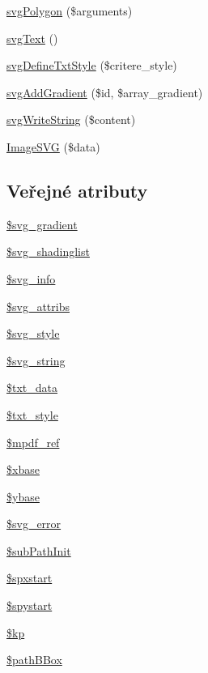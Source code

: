 \begin{DoxyCompactItemize}
\item 
\hyperlink{class_s_v_g_a8aa620a34aa7f03c4be98f58462ed1ba}{svg\-Polygon} (\$arguments)
\item 
\hyperlink{class_s_v_g_a8a02aa9b134167bb207c7899eed128d2}{svg\-Text} ()
\item 
\hyperlink{class_s_v_g_a43f04d1bc674a123f4f262fe49de85df}{svg\-Define\-Txt\-Style} (\$critere\-\_\-style)
\item 
\hyperlink{class_s_v_g_ad3d18ab96a62ae406523cba13be14320}{svg\-Add\-Gradient} (\$id, \$array\-\_\-gradient)
\item 
\hyperlink{class_s_v_g_aba4772ae2118cd81b7f25393ece61434}{svg\-Write\-String} (\$content)
\item 
\hyperlink{class_s_v_g_aa98d46b0c605b645685286a1838c64a8}{Image\-S\-V\-G} (\$data)
\end{DoxyCompactItemize}
\subsection*{Veřejné atributy}
\begin{DoxyCompactItemize}
\item 
\hyperlink{class_s_v_g_a7af1d7443fbab8860431fd8faba87ede}{\$svg\-\_\-gradient}
\item 
\hyperlink{class_s_v_g_a3a87e4c389b95e944d583a943e903260}{\$svg\-\_\-shadinglist}
\item 
\hyperlink{class_s_v_g_acf3e043686c33a3522d3a9977a7f276e}{\$svg\-\_\-info}
\item 
\hyperlink{class_s_v_g_aadddae146f2572ce7596765053e55b59}{\$svg\-\_\-attribs}
\item 
\hyperlink{class_s_v_g_ac77e12c9b6b76da3203c9a493e615312}{\$svg\-\_\-style}
\item 
\hyperlink{class_s_v_g_a8efc8627d939c38e431c20516b058431}{\$svg\-\_\-string}
\item 
\hyperlink{class_s_v_g_a203118bf140223a634aa00b8d55e10e7}{\$txt\-\_\-data}
\item 
\hyperlink{class_s_v_g_a2ae5fc0a696a5f74a720693bccfdf810}{\$txt\-\_\-style}
\item 
\hyperlink{class_s_v_g_ac1da703f34d7051884c1e778806966dc}{\$mpdf\-\_\-ref}
\item 
\hyperlink{class_s_v_g_a0aded876349f4091004a9aa222d0254f}{\$xbase}
\item 
\hyperlink{class_s_v_g_a6ef0f926687479e0ebd731660a89cd28}{\$ybase}
\item 
\hyperlink{class_s_v_g_aa1a28f8b36a24698b86d8b845b9bf34a}{\$svg\-\_\-error}
\item 
\hyperlink{class_s_v_g_af3ba85f87094ababec3695fe55559bdf}{\$sub\-Path\-Init}
\item 
\hyperlink{class_s_v_g_a902d9988c9b8156ba4d50e9193744e34}{\$spxstart}
\item 
\hyperlink{class_s_v_g_a52ac5b582840093ac704077a05521b7c}{\$spystart}
\item 
\hyperlink{class_s_v_g_a7857b1fd0054ec4ed4762689d12f4759}{\$kp}
\item 
\hyperlink{class_s_v_g_a34563ad38713f2ed92a13eae09bfe86c}{\$path\-B\-Box}
\end{DoxyCompactItemize}


